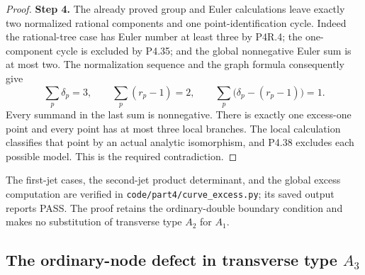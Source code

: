 \begin{proof}
\noindent\textbf{Step 4.} The already proved group and Euler calculations leave
exactly two normalized rational components and one
point-identification cycle. Indeed the rational-tree case
has Euler number at least three by P4R.4; the
one-component cycle is excluded by P4.35; and the global
nonnegative Euler sum is at most two. The normalization
sequence and the graph formula consequently give
\[
 \sum_p\delta_p=3,\qquad
 \sum_p(r_p-1)=2,
 \qquad
 \sum_p\bigl(\delta_p-(r_p-1)\bigr)=1.
\]
Every summand in the last sum is nonnegative. There is
exactly one excess-one point and every point has at most
three local branches. The local calculation classifies that
point by an actual analytic isomorphism, and P4.38 excludes
each possible model. This is the required contradiction.
\end{proof}

The first-jet cases, the second-jet product determinant, and
the global excess computation are verified in
\texttt{code/part4/curve\_excess.py}; its saved output reports
PASS. The proof retains the ordinary-double boundary
condition and makes no substitution of transverse type
$A_2$ for $A_1$.


\subsection{The ordinary-node defect in transverse type \texorpdfstring{$A_3$}{A3}}

